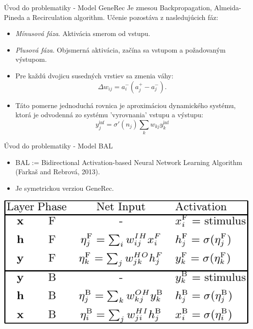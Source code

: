 \documentclass[xcolor=dvipsnames]{beamer}
\begin{document}
\begin{frame}{Úvod do problematiky - Model GeneRec}
Je zmesou Backpropagation, Almeida-Pineda a Recirculation algorithm. Učenie pozostáva z nasledujúcich fáz: 
  \begin{itemize}
    \item \emph{Mínusová fáza}. Aktivácia smerom od vstupu. 
    \item \emph{Plusová fáza}. Objsmerná aktivácia, začína sa vstupom a požadovaným výstupom. 
    \item Pre každú dvojicu susedných vrstiev sa zmenia váhy: 
    $$\Delta w_{ij} = a_i^{-}(a_j^{+} - a_j^{-}).$$
    \item Táto pomerne jednoduchá rovnica je aproximáciou dynamického systému, ktorá je odvodenná zo systému 'vyrovnania' vstupu a výstupu: 
    $$y_j^{\inf} = \sigma'(n_j)\sum_k w_{kj}y_k^{\inf}$$
  \end{itemize}
\end{frame}

\begin{frame}{Úvod do problematiky - Model BAL}
  \begin{itemize}
    \item BAL := Bidirectional Activation-based Neural Network Learning Algorithm (Farkaš and Rebrová, 2013).
    \item Je symetrickou verziou GeneRec.
  \end{itemize}
  
  \begin{center}
    \includegraphics[scale=0.5]{img/bal_table.png}
  \end{center}  
\end{frame}
\end{document}
